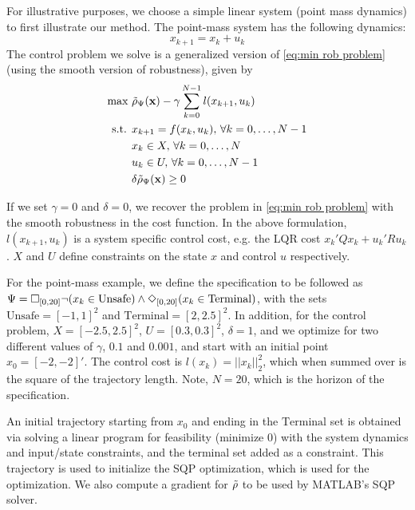 For illustrative purposes, we choose a simple linear system (point mass dynamics) to first illustrate our method. The point-mass system has the following dynamics:
\begin{equation}
\label{eq:PointMass}
x_{k+1} = x_k + u_k
\end{equation}
The control problem we solve is a generalized version of \eqref{eq:min rob problem} (using the smooth version of robustness), given by
\begin{subequations}
\label{eq:general_ctrl}
\begin{align}
\text{max } & \tilde{\rho}_{\Psi}(\mathbf{x}) - \gamma \sum_{k=0}^{N-1} l(x_{k+1},u_{k}) \\
\text{s.t. } & x_{k+1} = f(x_k,u_k), \, \forall k=0,\dotsc,N-1 \\
 & x_k \in X, \, \forall k=0,\dotsc,N \\
 & u_k \in U, \, \forall k=0,\dotsc,N-1 \\
 & \delta \tilde{\rho}_{\Psi}(\mathbf{x}) \geq 0
\end{align}
\end{subequations}

If we set $\gamma=0$ and $\delta=0$, we recover the problem in \eqref{eq:min rob problem} with the smooth robustness in the cost function. In the above formulation, $l(x_{k+1},u_{k})$ is a system specific control cost, e.g. the LQR cost $x_k'Qx_k + u_k'Ru_k$. $X$ and $U$ define constraints on the state $x$ and control $u$ respectively. 

For the point-mass example, we define the specification to be followed as $\Psi = \square_{[0,20]} \neg (x_k \in \text{Unsafe}) \wedge \Diamond_{[0,20]} (x_k \in \text{Terminal})$, with the sets $\text{Unsafe}=[-1,1]^2$ and $\text{Terminal}=[2,2.5]^2$. In addition, for the control problem, $X=[-2.5,2.5]^2$, $U=[0.3,0.3]^2$, $\delta=1$, and we optimize for two different values of $\gamma$, $0.1$ and $0.001$, and start with an initial point $x_0=[-2,-2]'$. The control cost is $l(x_k) = ||x_k||_{2}^2$, which when summed over is the square of the trajectory length. Note, $N=20$, which is the horizon of the specification.

An initial trajectory starting from $x_0$ and ending in the $\text{Terminal}$ set is obtained via solving a linear program for feasibility ($\text{minimize } 0$) with the system dynamics and input/state constraints, and the terminal set added as a constraint. This trajectory is used to initialize the SQP optimization, which is used for the optimization. We also compute a gradient for $\tilde{\rho}$ to be used by MATLAB's SQP solver.

